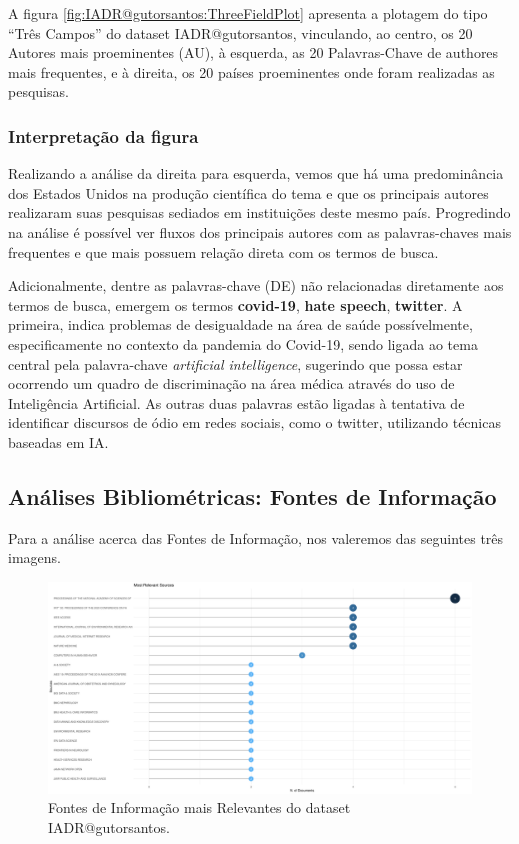 A figura \ref{fig:IADR@gutorsantos:ThreeFieldPlot} apresenta a plotagem do tipo ``Três Campos'' do dataset IADR@gutorsantos, vinculando, ao centro, os 20 Autores mais proeminentes (AU), à esquerda, as 20 Palavras-Chave de authores mais frequentes, e à direita, os 20 países proeminentes onde foram realizadas as pesquisas.

\subsubsection{Interpretação da figura}
Realizando a análise da direita para esquerda, vemos que há uma predominância dos Estados Unidos na produção científica do tema e que os principais autores realizaram suas pesquisas sediados em instituições deste mesmo país. Progredindo na análise é possível ver fluxos dos principais autores com as palavras-chaves mais frequentes e que mais possuem relação direta com os termos de busca.

Adicionalmente, dentre as palavras-chave (DE) não relacionadas diretamente aos termos de busca, emergem os termos \textbf{covid-19}, \textbf{hate speech}, \textbf{twitter}. A primeira, indica problemas de desigualdade na área de saúde possívelmente, especificamente no contexto da pandemia do Covid-19, sendo ligada ao tema central pela palavra-chave \textit{artificial intelligence}, sugerindo que possa estar ocorrendo um quadro de discriminação na área médica através do uso de Inteligência Artificial. As outras duas palavras estão ligadas à tentativa de identificar discursos de ódio em redes sociais, como o twitter, utilizando técnicas baseadas em IA.

\subsection{Análises Bibliométricas: Fontes de Informação}

Para a análise acerca das Fontes de Informação, nos valeremos das seguintes três imagens.

\begin{figure}[H]
    \centering
    \includegraphics[angle=0,width=1\textwidth]{experiments/gutorsantos/AnaliseBibliometrica/IAeDiscriminacao/imgs/MostRelevantSources-2022-02-09.png}
    \caption{Fontes de Informação mais Relevantes do dataset IADR@gutorsantos.}
    \label{fig:IADR@gutorsantos:RelevantSources}
\end{figure}

